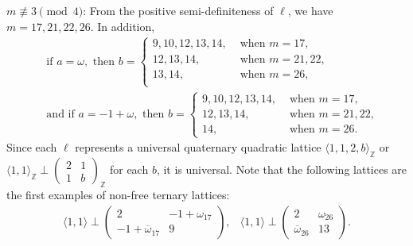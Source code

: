 \documentclass[a4paper,10pt,reqno]{amsart}
\begin{document}
{} $m {\not\equiv} 3 \pmod{4}$: From the positive
semi-definiteness of $\ell$, we have $m=17,21,22,26$. In addition,
\begin{align*}
    &\text{ if } a=\omega, \text{ then }  b = \begin{cases}
                                             9,  10, 12, 13, 14,  &\text{ when } m = 17,\\
                                             12, 13, 14,          &\text{ when } m = 21, 22,\\
                                             13, 14,                  &\text{ when } m = 26,\\
                                            \end{cases}\\
    &\text{ and if } a= -1+\omega, \text{ then }  b = \begin{cases}
                                                 9,  10, 12, 13, 14, &\text{ when } m = 17,\\
                                                 12, 13, 14,         &\text{ when } m = 21, 22,\\
                                                 14,                     &\text{ when } m = 26.
                                                 \end{cases}
\end{align*}
Since each $\ell$ represents a universal quaternary quadratic lattice ${\langle {1,1,2,b} \rangle}_{\mathbb{Z}}$ or
${\langle {1,1} \rangle}_{\mathbb{Z}} \perp{\begin{pmatrix}
  2 & 1 \\
  1 & b
\end{pmatrix}}_{\mathbb{Z}}$ for each $b$, it is universal. Note that the following
lattices are the first examples of non-free ternary lattices:
\[
    \begin{array}{ll}
        {\langle {1,1} \rangle} \perp {\begin{pmatrix}
  2 & {-1+\omega_{17}} \\
  {-1+{{{\overline{\omega}}}}_{17}} & 9
\end{pmatrix}},
       &{\langle {1,1} \rangle} \perp {\begin{pmatrix}
  2 & {\omega_{26}} \\
  {{{{\overline{\omega}}}}_{26}} & {13}
\end{pmatrix}}.
    \end{array}
\]
\end{document}
